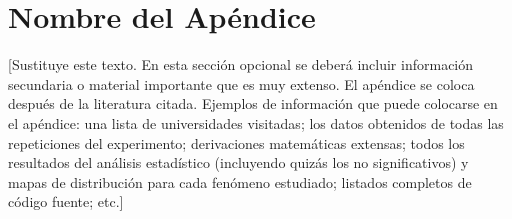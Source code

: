 \chapter{Nombre del Apéndice}\label{apendiceA}

[Sustituye este texto.
En esta sección opcional se deberá incluir información secundaria o material importante que es muy extenso. El apéndice se coloca después de la literatura citada. Ejemplos de información que puede colocarse en el apéndice: una lista de universidades visitadas; los datos obtenidos de todas las repeticiones del experimento; derivaciones matemáticas extensas; todos los resultados del análisis estadístico (incluyendo quizás los no significativos) y mapas de distribución para cada fenómeno estudiado; listados completos de código fuente; etc.]

